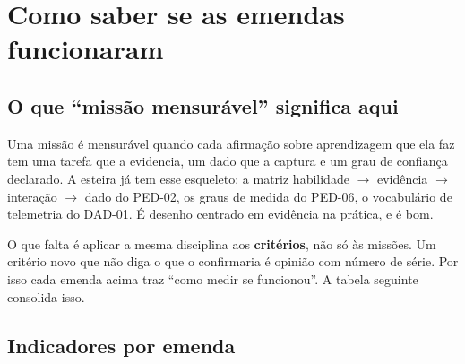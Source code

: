 \documentclass[11pt,a4paper]{article}
\begin{document}
\section{Como saber se as emendas funcionaram}

\subsection{O que ``missão mensurável'' significa aqui}

Uma missão é mensurável quando cada afirmação sobre aprendizagem que ela faz tem uma tarefa que a
evidencia, um dado que a captura e um grau de confiança declarado. A esteira já tem esse esqueleto:
a matriz habilidade $\to$ evidência $\to$ interação $\to$ dado do PED-02, os graus de medida do
PED-06, o vocabulário de telemetria do DAD-01. É desenho centrado em evidência
\cite{mislevy2003} na prática, e é bom.

O que falta é aplicar a mesma disciplina aos \textbf{critérios}, não só às missões. Um critério
novo que não diga o que o confirmaria é opinião com número de série. Por isso cada emenda acima
traz ``como medir se funcionou''. A tabela seguinte consolida isso.

\subsection{Indicadores por emenda}
\end{document}
